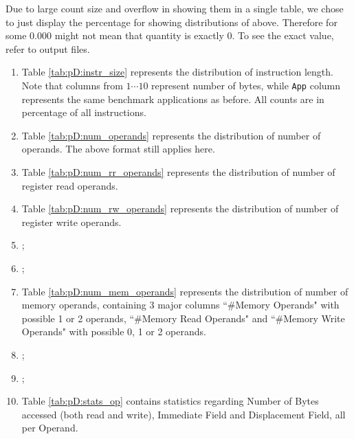 \begin{Solution}

Due to large count size and overflow in showing them in a single table, we chose to just display the percentage for showing distributions of above. Therefore for some $0.000$ might not mean that quantity is exactly $0$. To see the exact value, refer to output files.

\begin{enumerate}[label=\arabic*., itemsep=0.2pt]
\item Table \ref{tab:pD:instr_size} represents the distribution of instruction length. Note that columns from $1 \cdots 10$ represent number of bytes, while \texttt{App} column represents the same benchmark applications as before. All counts are in percentage of all instructions.
\item Table \ref{tab:pD:num_operands} represents the distribution of number of operands. The above format still applies here.
\item Table \ref{tab:pD:num_rr_operands} represents the distribution of number of register read operands.
\item Table \ref{tab:pD:num_rw_operands} represents the distribution of number of register write operands.
\item ;
\item ;
\item Table \ref{tab:pD:num_mem_operands} represents the distribution of number of memory operands, containing 3 major columns ``\#Memory Operands" with possible 1 or 2 operands, ``\#Memory Read Operands" and ``\#Memory Write Operands" with possible 0, 1 or 2 operands.
\item ;
\item ;
\item Table \ref{tab:pD:stats_op} contains statistics regarding Number of Bytes accessed (both read and write), Immediate Field and Displacement Field, all per Operand.
\end{enumerate}


\end{Solution}
